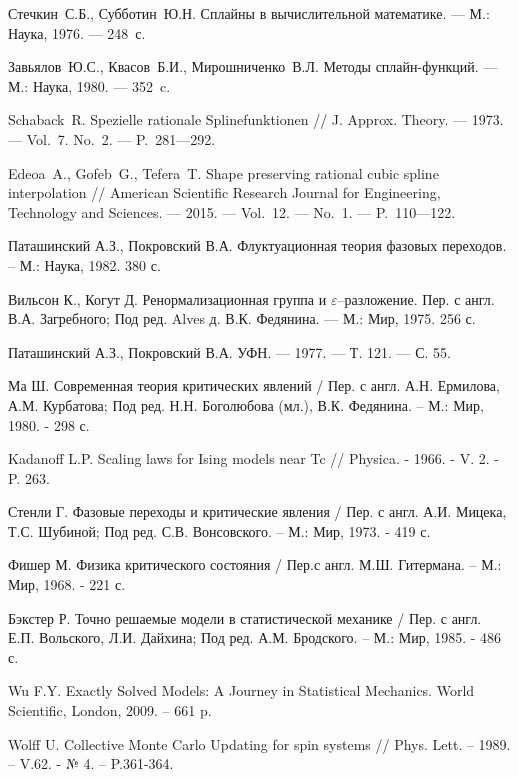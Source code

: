 \begin{thebibliography}{111}
  Стечкин~С.Б., Субботин~Ю.Н. Сплайны в вычислительной математике.
 --- М.: Наука, 1976. --- 248~с.

  Завьялов~Ю.С., Квасов~Б.И., Мирошниченко~В.Л. Методы сплайн-функций.
 --- М.: Наука, 1980. --- 352~c.

  Schaback~R.  Spezielle rationale Splinefunktionen // J. Approx. Theory. --- 1973. --- Vol.~7. No.~2. --- P.~281---292.  

 Edeoa~A., Gofeb~G., Tefera~T. Shape preserving rational cubic spline interpolation // American Scientific Research Journal for Engineering, Technology and Sciences. --- 2015. --- Vol.~12. --- No.~1. --- P.~110---122.  
 
 

Паташинский А.З., Покровский В.А. Флуктуационная теория фазовых переходов. -- М.: Наука, 1982. 380 с.

Вильсон К., Когут Д. Ренормализационная группа и $\varepsilon$--разложение. Пер. с англ. В.А. Загребного; Под ред. Alves д. В.К. Федянина. --- М.: Мир, 1975. 256 с.

Паташинский А.З., Покровский В.А. УФН. --- 1977. --- Т. 121. --- С. 55.

Ма Ш. Современная теория критических явлений / Пер. с англ. А.Н. Ермилова, А.М. Курбатова; Под ред. Н.Н. Боголюбова (мл.), В.К. Федянина. -- М.: Мир, 1980. - 298 с.

Kadanoff L.P. Scaling laws for Ising models near Tc // Physica. - 1966. - V. 2. - P. 263.

Стенли Г. Фазовые переходы и критические явления / Пер. с англ. А.И.  Мицека, Т.С. Шубиной; Под ред. С.В. Вонсовского. -- М.: Мир, 1973. - 419 с.

Фишер М. Физика критического состояния / Пер.с англ. М.Ш. Гитермана. -- М.: Мир, 1968. - 221 с.

Бэкстер Р. Точно решаемые модели в статистической механике / Пер. с англ. Е.П. Вольского, Л.И. Дайхина; Под ред. А.М. Бродского. -- М.: Мир, 1985. - 486 с.

Wu F.Y. Exactly Solved Models: A Journey in Statistical Mechanics. World Scientific, London, 2009. -- 661 p.

Wolff U. Collective Monte Carlo Updating for spin systems // Phys. Lett. -- 1989. -- V.62. - № 4. -- P.361-364.


\end{thebibliography}
